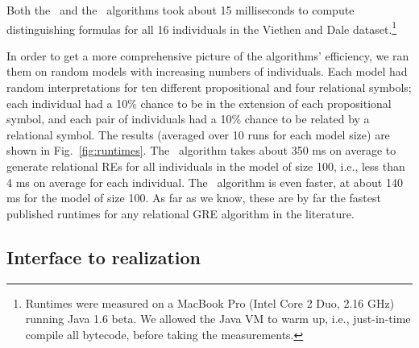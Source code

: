 Both the \el\ and the \alc\ algorithms took about 15 milliseconds to
compute distinguishing formulas for all 16 individuals in the Viethen
and Dale dataset.\footnote{Runtimes were measured on a MacBook Pro
  (Intel Core 2 Duo, 2.16 GHz) running Java 1.6 beta.  We allowed the
  Java VM to warm up, i.e., just-in-time compile all bytecode, before
  taking the measurements.}

In order to get a more comprehensive picture of the algorithms'
efficiency, we ran them on random models with increasing numbers of
individuals.  Each model had random interpretations for ten different
propositional and four relational symbols; each individual had a 10\%
chance to be in the extension of each propositional symbol, and each
pair of individuals had a 10\% chance to be related by a relational
symbol.  The results (averaged over 10 runs for each model size) are
shown in Fig.~\ref{fig:runtimes}.  The \el\
algorithm takes about 350 ms on average to generate relational REs for
all individuals in the model of size 100, i.e., less than 4 ms on
average for each individual.  The \alc\ algorithm is even faster, at
about 140 ms for the model of size 100.  As far as we know, these are
by far the fastest published runtimes for any relational GRE algorithm
in the literature.




\subsection{Interface to realization}
\label{sec:discussion-realization}


